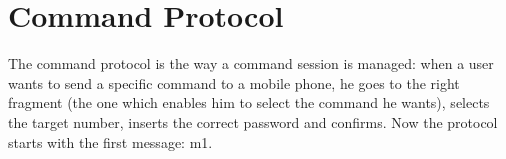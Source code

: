 \section{Command Protocol}
The command protocol is the way a command session is managed: when a user wants to send a specific command to a mobile phone, he goes to the right fragment (the one which enables him to select the command he wants), selects the target number, inserts the correct password and confirms. Now the protocol starts with the first message: m1.